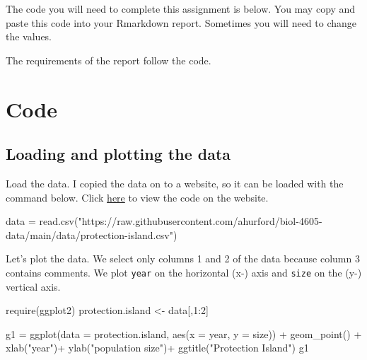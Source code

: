 \documentclass[
]{book}
\newenvironment{Shaded}{\begin{snugshade}}{\end{snugshade}}
\newcommand{\AttributeTok}[1]{\textcolor[rgb]{0.77,0.63,0.00}{#1}}
\newcommand{\DecValTok}[1]{\textcolor[rgb]{0.00,0.00,0.81}{#1}}
\newcommand{\FunctionTok}[1]{\textcolor[rgb]{0.00,0.00,0.00}{#1}}
\newcommand{\NormalTok}[1]{#1}
\newcommand{\OtherTok}[1]{\textcolor[rgb]{0.56,0.35,0.01}{#1}}
\newcommand{\SpecialCharTok}[1]{\textcolor[rgb]{0.00,0.00,0.00}{#1}}
\newcommand{\StringTok}[1]{\textcolor[rgb]{0.31,0.60,0.02}{#1}}
\begin{document}
The code you will need to complete this assignment is below. You may copy and paste this code into your Rmarkdown report. Sometimes you will need to change the values.

The requirements of the report follow the code.

\hypertarget{code}{%
\section{Code}\label{code}}

\hypertarget{loading-and-plotting-the-data}{%
\subsection{Loading and plotting the data}\label{loading-and-plotting-the-data}}

Load the data. I copied the data on to a website, so it can be loaded with the command below. Click \href{https://github.com/ahurford/biol-4605-data/blob/main/data/protection-island.csv}{here} to view the code on the website.

\begin{Shaded}
\begin{Highlighting}[]
\NormalTok{data }\OtherTok{=} \FunctionTok{read.csv}\NormalTok{(}\StringTok{"https://raw.githubusercontent.com/ahurford/biol{-}4605{-}data/main/data/protection{-}island.csv"}\NormalTok{)}
\end{Highlighting}
\end{Shaded}

Let's plot the data. We select only columns 1 and 2 of the data because column 3 contains comments. We plot \texttt{year} on the horizontal (x-) axis and \texttt{size} on the (y-) vertical axis.

\begin{Shaded}
\begin{Highlighting}[]
\FunctionTok{require}\NormalTok{(ggplot2)}
\NormalTok{protection.island }\OtherTok{\textless{}{-}}\NormalTok{ data[,}\DecValTok{1}\SpecialCharTok{:}\DecValTok{2}\NormalTok{]}

\NormalTok{g1 }\OtherTok{=} \FunctionTok{ggplot}\NormalTok{(}\AttributeTok{data =}\NormalTok{ protection.island, }\FunctionTok{aes}\NormalTok{(}\AttributeTok{x =}\NormalTok{ year, }\AttributeTok{y =}\NormalTok{ size)) }\SpecialCharTok{+} 
  \FunctionTok{geom\_point}\NormalTok{() }\SpecialCharTok{+}
  \FunctionTok{xlab}\NormalTok{(}\StringTok{"year"}\NormalTok{)}\SpecialCharTok{+}
  \FunctionTok{ylab}\NormalTok{(}\StringTok{"population size"}\NormalTok{)}\SpecialCharTok{+}
  \FunctionTok{ggtitle}\NormalTok{(}\StringTok{"Protection Island"}\NormalTok{)}
\NormalTok{g1}
\end{Highlighting}
\end{Shaded}
\end{document}
